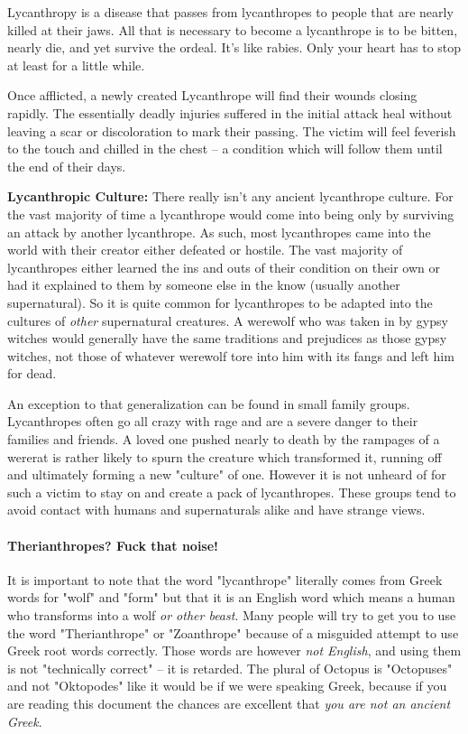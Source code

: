 Lycanthropy is a disease that passes from lycanthropes to people that are nearly killed at their jaws. All that is necessary to become a lycanthrope is to be bitten, nearly die, and yet survive the ordeal. It's like rabies. Only your heart has to stop at least for a little while.

Once afflicted, a newly created Lycanthrope will find their wounds closing rapidly. The essentially deadly injuries suffered in the initial attack heal without leaving a scar or discoloration to mark their passing. The victim will feel feverish to the touch and chilled in the chest -- a condition which will follow them until the end of their days.

\textbf{Lycanthropic Culture:} There really isn't any ancient lycanthrope culture. For the vast majority of time a lycanthrope would come into being only by surviving an attack by another lycanthrope. As such, most lycanthropes came into the world with their creator either defeated or hostile. The vast majority of lycanthropes either learned the ins and outs of their condition on their own or had it explained to them by someone else in the know (usually another supernatural). So it is quite common for lycanthropes to be adapted into the cultures of \textit{other} supernatural creatures. A werewolf who was taken in by gypsy witches would generally have the same traditions and prejudices as those gypsy witches, not those of whatever werewolf tore into him with its fangs and left him for dead.

An exception to that generalization can be found in small family groups. Lycanthropes often go all crazy with rage and are a severe danger to their families and friends. A loved one pushed nearly to death by the rampages of a wererat is rather likely to spurn the creature which transformed it, running off and ultimately forming a new "culture" of one. However it is not unheard of for such a victim to stay on and create a pack of lycanthropes. These groups tend to avoid contact with humans and supernaturals alike and have strange views.

\paragraph{Therianthropes? Fuck that noise!} It is important to note that the word "lycanthrope" literally comes from Greek words for "wolf" and "form" but that it is an English word which means a human who transforms into a wolf \textit{or other beast}. Many people will try to get you to use the word "Therianthrope" or "Zoanthrope" because of a misguided attempt to use Greek root words correctly. Those words are however \textit{not English}, and using them is not "technically correct" -- it is retarded. The plural of Octopus is "Octopuses" and not "Oktopodes" like it would be if we were speaking Greek, because if you are reading this document the chances are excellent that \textit{you are not an ancient Greek}.

